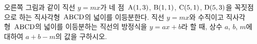 \noindent\begin{minipage}[t]{0.58\linewidth}\vspace{0pt}\raggedright 오른쪽 그림과 같이 직선 $y=mx$가 네 점~$\mathrm{A}(1{,}\mkern3mu\mathopen{}3)$, $\mathrm{B}(1{,}\mkern3mu\mathopen{}1)$, $\mathrm{C}(5{,}\mkern3mu\mathopen{}1)$, $\mathrm{D}(5{,}\mkern3mu\mathopen{}3)$을 꼭짓점으로 하는 직사각형~$\mathrm{ABCD}$의 넓이를 이등분한다. 직선 $y=mx$와 수직이고 직사각형~$\mathrm{ABCD}$의 넓이를 이등분하는 직선의 방정식을 $y=ax+b$라 할 때, 상수 $a$, $b$, $m$에 대하여 $a+b-m$의 값을 구하시오.\end{minipage}\hfill\begin{minipage}[t]{0.4\linewidth}\vspace{0pt}\centering \resizebox{\ifdim\width>\linewidth\linewidth\else\width\fi}{!}{}\end{minipage}\par
